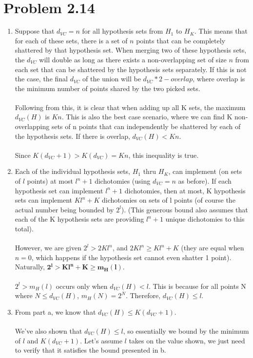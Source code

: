 \documentclass[12pt]{article}
\begin{document}
\section*{Problem 2.14}
\begin{enumerate}[label=(\alph*)]
	\item Suppose that $d_{VC} = n$ for all hypothesis sets from $H_1$ to $H_K$. This means that for each of these sets, there is a set of $n$ points that can be completely shattered by that hypothesis set. When merging two of these hypothesis sets, the $d_{VC}$ will double as long as there exists a non-overlapping set of size $n$ from each set that can be shattered by the hypothesis sets separately. If this is not the case, the final $d_{VC}$ of the union will be $d_{VC}*2 - overlap$, where overlap is the minimum number of points shared by the two picked sets.
	\\ \\ Following from this, it is clear that when adding up all K sets, the maximum $d_{VC}(H)$ is $Kn$. This is also the best case scenario, where we can find K non-overlapping sets of n points that can independently be shattered by each of the hypothesis sets. If there is overlap, $d_{VC}(H) < Kn$.
	\\ \\ Since $K(d_{VC} + 1) > K(d_{VC}) = Kn$, this inequality is true.
	\item Each of the individual hypothesis sets, $H_1$ thru $H_K$, can implement (on sets of $l$ points) at most $l^n + 1$ dichotomies (using $d_{VC} = n$ as before). If each hypothesis set can implement $l^n + 1$ dichotomies, then at most, K hypothesis sets can implement $Kl^n + K$ dichotomies on sets of l points (of course the actual number being bounded by $2^l$). (This generous bound also assumes that each of the K hypothesis sets are providing $l^n+1$ unique dichotomies to this total).
	\\ \\ However, we are given $2^l > 2Kl^n$, and $2Kl^n \ge Kl^n + K$ (they are equal when $n = 0$, which happens if the hypothesis set cannot even shatter 1 point). Naturally, $\boldsymbol{2^l > Kl^n + K \ge m_H(l)}$.
	\\ \\ $2^l > m_H(l)$ occurs only when $d_{VC}(H) < l$. This is because for all points N where $N \le d_{VC}(H)$, $m_H(N) = 2^N$. Therefore, $d_{VC}(H) \le l$.
	\item From part a, we know that $d_{VC}(H) \le K(d_{VC} + 1)$.
	\\ \\ We've also shown that $d_{VC}(H) \le l$, so essentially we bound by the minimum of $l$ and $K(d_{VC} + 1)$. Let's assume $l$ takes on the value shown, we just need to verify that it satisfies the bound presented in b.

\end{enumerate}
\end{document}
